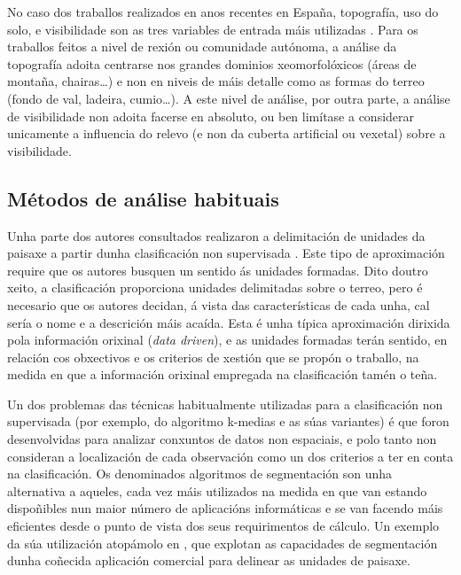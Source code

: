 \documentclass[11pt,a4paper]{article}
\begin{document}
No caso dos traballos realizados en anos recentes en España, topografía, uso do solo, e visibilidade son as tres variables de entrada máis utilizadas \citep{Valles2013}. Para os traballos feitos a nivel de rexión ou comunidade autónoma, a análise da topografía adoita centrarse nos grandes dominios xeomorfolóxicos (áreas de montaña, chairas\ldots) e non en niveis de máis detalle como as formas do terreo (fondo de val, ladeira, cumio\ldots). A este nivel de análise, por outra parte, a análise de visibilidade non adoita facerse en absoluto, ou ben limítase a considerar unicamente a influencia do relevo (e non da cuberta artificial ou vexetal) sobre a visibilidade.

\subsection{Métodos de análise habituais}

Unha parte dos autores consultados realizaron a delimitación de unidades da paisaxe a partir dunha clasificación non supervisada \citep{VanEetvelde2009160,Chuman2010200,Soto2010720}. Este tipo de aproximación require que os autores busquen un sentido ás unidades formadas. Dito doutro xeito, a clasificación proporciona unidades delimitadas sobre o terreo, pero é necesario que os autores decidan, á vista das características de cada unha, cal sería o nome e a descrición máis acaída. Esta é unha típica aproximación dirixida pola información orixinal (\emph{data driven}), e as unidades formadas terán sentido, en relación cos obxectivos e os criterios de xestión que se propón o traballo, na medida en que a información orixinal empregada na clasificación tamén o teña.

Un dos problemas das técnicas habitualmente utilizadas para a clasificación non supervisada (por exemplo, do algoritmo k-medias e as súas variantes) é que foron desenvolvidas para analizar conxuntos de datos non espaciais, e polo tanto non consideran a localización de cada observación como un dos criterios a ter en conta na clasificación. Os denominados algoritmos de segmentación son unha alternativa a aqueles, cada vez máis utilizados na medida en que van estando dispoñibles nun maior número de aplicacións informáticas e se van facendo máis eficientes desde o punto de vista dos seus requirimentos de cálculo. Un exemplo da súa utilización atopámolo en \citet{Mucher201087}, que explotan as capacidades de segmentación dunha coñecida aplicación comercial para delinear as unidades de paisaxe.
\end{document}
